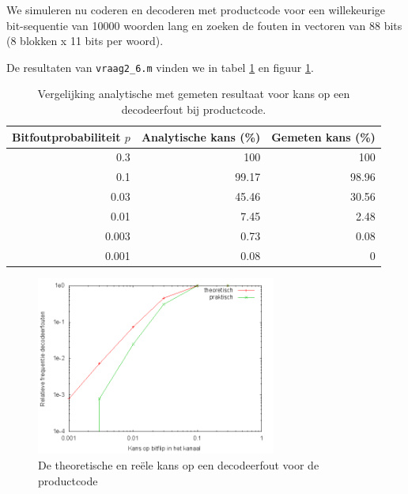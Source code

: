 \documentclass[]{article}
\begin{document}
\begin{section}
\begin{subsection}
        We simuleren nu coderen en decoderen met productcode voor een
        willekeurige bit-sequentie van 10000 woorden lang en zoeken de
        fouten in vectoren van 88 bits (8 blokken x 11 bits per woord).
        
        De resultaten van \texttt{vraag2\_6.m} vinden we in tabel
        \ref{tab:2_6} en figuur \ref{fig:2_6}.

        \begin{table}[h]
            \centering	
            \begin{tabular}{r|r|r}
                Bitfoutprobabiliteit $p$ &
                Analytische kans (\%) &
                Gemeten kans (\%)\\
                \hline
                0.3   & 100    & 100   \\
                0.1   &  99.17 & 98.96 \\
                0.03  &  45.46 & 30.56 \\
                0.01  &   7.45 & 2.48  \\
                0.003 &   0.73 & 0.08  \\
                0.001 &   0.08 & 0
            \end{tabular}
            \caption{Vergelijking analytische met gemeten resultaat
            voor kans op een decodeerfout bij productcode.}
            \label{tab:2_6}
        \end{table}
        
        \begin{figure}[h]
            \centering
            \includegraphics[width=0.7\textwidth]{vraag2_6.png}
            \caption{De theoretische en re\"ele kans op een
            decodeerfout voor de productcode}
            \label{fig:2_6}
        \end{figure}
    \end{subsection}
	

\end{section}
\end{document}

